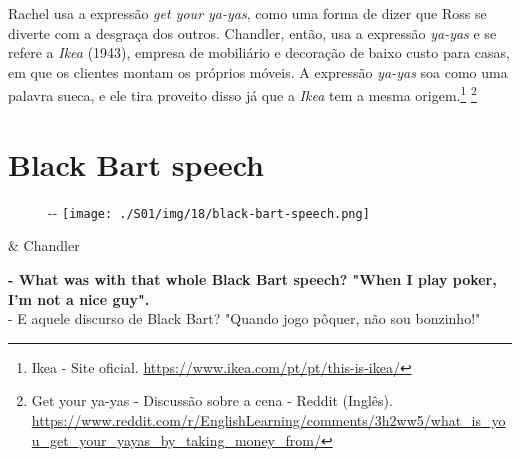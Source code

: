 Rachel usa a expressão \emph{get your ya-yas}, como uma forma de dizer
que Ross se diverte com a desgraça dos outros. Chandler, então, usa a
expressão \emph{ya-yas} e se refere a \emph{Ikea} (1943), empresa de
mobiliário e decoração de baixo custo para casas, em que os clientes
montam os próprios móveis. A expressão \emph{ya-yas} soa como uma
palavra sueca, e ele tira proveito disso já que a \emph{Ikea} tem a
mesma origem.\footnote{\sloppy Ikea - Site oficial. \url{https://www.ikea.com/pt/pt/this-is-ikea/}}
\footnote{\sloppy Get your ya-yas - Discussão sobre a cena - Reddit (Inglês). \url{https://www.reddit.com/r/EnglishLearning/comments/3h2ww5/what_is_you_get_your_yayas_by_taking_money_from/}}

\hypertarget{black-bart-speech}{%
\section{Black Bart speech}\label{black-bart-speech}}

\begin{figure}[!ht]
  \begin{adjustwidth}{-\oddsidemargin-1in}{-\rightmargin}
    \centering
    \texttt{[image: ./S01/img/18/black-bart-speech.png]}
  \end{adjustwidth}
\end{figure}

\begin{tcolorbox}[enhanced,center upper,
    drop fuzzy shadow southeast, boxrule=0.3pt,
    lower separated=false, breakable,
    colframe=black!30!dialogoBorder,colback=white]
\begin{minipage}[c]{0.16\linewidth}
   & \centering \scriptsize{Chandler}
\end{minipage}
\hfill
\begin{minipage}[c]{0.8\linewidth}
  \textbf{- What was with that whole Black Bart speech? "When I play poker, I'm not a nice guy".}\\
  - E aquele discurso de Black Bart? "Quando jogo pôquer, não sou bonzinho!"
\end{minipage}
\end{tcolorbox}


